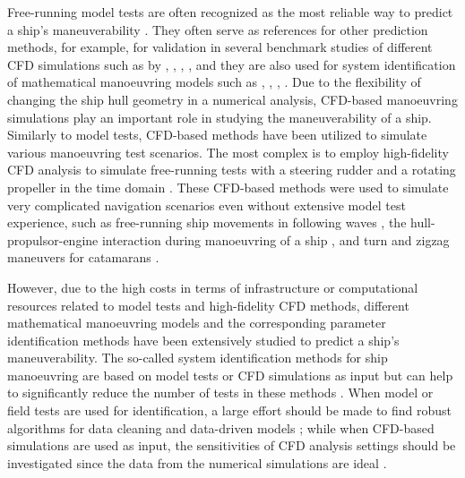 Free-running model tests are often recognized as the most reliable way to predict a ship's maneuverability \citep{ittcITTCRecommendedProcedures2008}. They often serve as references for other prediction methods, for example, for validation in several benchmark studies of different CFD simulations such as by \citet{sternExperienceSIMMAN20082011}, \citet{sakamotoURANSSimulationsStatic2012}, \citet{yoonBenchmarkCFDValidation2015a}, \citet{yasukawaValidation6DOFMotion2021}, and they are also used for system identification of mathematical manoeuvring models such as \citet{luoParameterIdentificationShip2016}, \citet{xuUncertaintyAnalysisHydrodynamic2019}, \citet{wangOptimalDesignExcitation2020}, \citet{alexanderssonSystemIdentificationVessel2022}. Due to the flexibility of changing the ship hull geometry in a numerical analysis, CFD-based manoeuvring simulations play an important role in studying the maneuverability of a ship. Similarly to model tests, CFD-based methods have been utilized to simulate various manoeuvring test scenarios. The most complex is to employ high-fidelity CFD analysis to simulate free-running tests with a steering rudder and a rotating propeller in the time domain \citep{dubbiosoTurningAbilityAnalysis2016a, islamEstimationHydrodynamicDerivatives2018}. These CFD-based methods were used to simulate very complicated navigation scenarios even without extensive model test experience, such as free-running ship movements in following waves \citep{Araki2019}, the hull-propulsor-engine interaction during manoeuvring of a ship \citep{elmoctarRANSBasedSimulatedShip2014}, and turn and zigzag maneuvers for catamarans \citep{dumanTurnZigzagManoeuvres2022}.

However, due to the high costs in terms of infrastructure or computational resources related to model tests and high-fidelity CFD methods, different mathematical manoeuvring models and the corresponding parameter identification methods have been extensively studied to predict a ship’s maneuverability. The so-called system identification methods for ship manoeuvring are based on model tests or CFD simulations as input but can help to significantly reduce the number of tests in these methods \citep{lokukalugep.pereraSystemIdentificationVessel2016,alexanderssonSystemIdentificationPhysicsinformed2024b}. When model or field tests are used for identification, a large effort should be made to find robust algorithms for data cleaning and data-driven models \citep{revestidoherreroTwostepIdentificationNonlinear2012,alexanderssonSystemIdentificationVessel2022,duShipManeuveringPrediction2022}; while when CFD-based simulations are used as input, the sensitivities of CFD analysis settings should be investigated since the data from the numerical simulations are ideal \citep{liuPredictionsShipManeuverability2018}.

